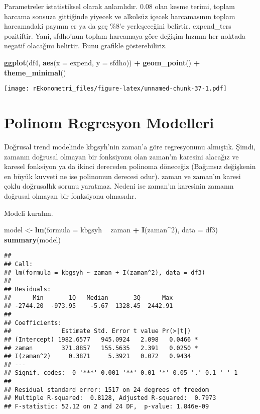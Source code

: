 \documentclass[
]{book}
\newenvironment{Shaded}{\begin{snugshade}}{\end{snugshade}}
\newcommand{\DataTypeTok}[1]{\textcolor[rgb]{0.13,0.29,0.53}{#1}}
\newcommand{\DecValTok}[1]{\textcolor[rgb]{0.00,0.00,0.81}{#1}}
\newcommand{\KeywordTok}[1]{\textcolor[rgb]{0.13,0.29,0.53}{\textbf{#1}}}
\newcommand{\NormalTok}[1]{#1}
\newcommand{\OperatorTok}[1]{\textcolor[rgb]{0.81,0.36,0.00}{\textbf{#1}}}
\newcommand{\StringTok}[1]{\textcolor[rgb]{0.31,0.60,0.02}{#1}}
\begin{document}
Parametreler istatistiksel olarak anlamlıdır. 0.08 olan kesme terimi, toplam harcama sonsuza gittiğinde yiyecek ve alkolsüz içecek harcamasının toplam harcamadaki payının er ya da geç \%8'e yerleşeceğini belirtir. expend\_ters pozitiftir. Yani, sfdho'nun toplam harcamaya göre değişim hızının her noktada negatif olacağını belirtir. Bunu grafikle gösterebiliriz.

\begin{Shaded}
\begin{Highlighting}[]
\KeywordTok{ggplot}\NormalTok{(df4, }\KeywordTok{aes}\NormalTok{(}\DataTypeTok{x =}\NormalTok{ expend, }\DataTypeTok{y =}\NormalTok{ sfdho)) }\OperatorTok{+}
\StringTok{  }\KeywordTok{geom_point}\NormalTok{() }\OperatorTok{+}
\StringTok{  }\KeywordTok{theme_minimal}\NormalTok{()}
\end{Highlighting}
\end{Shaded}

\texttt{[image: rEkonometri\_files/figure-latex/unnamed-chunk-37-1.pdf]}

\hypertarget{polinom-regresyon-modelleri}{%
\section{Polinom Regresyon Modelleri}\label{polinom-regresyon-modelleri}}

Doğrusal trend modelinde kbgsyh'nin zaman'a göre regresyonunu almıştık. Şimdi, zamanın doğrusal olmayan bir fonksiyonu olan zaman'ın karesini alacağız ve karesel fonksiyon ya da ikinci dereceden polinoma döneceğiz (Bağımsız değişkenin en büyük kuvveti ne ise polinomun derecesi odur). zaman ve zaman'ın karesi çoklu doğrusallık sorunu yaratmaz. Nedeni ise zaman'ın karesinin zamanın doğrusal olmayan bir fonksiyonu olmasıdır.

Modeli kuralım.

\begin{Shaded}
\begin{Highlighting}[]
\NormalTok{model <-}\StringTok{ }\KeywordTok{lm}\NormalTok{(}\DataTypeTok{formula =}\NormalTok{ kbgsyh }\OperatorTok{~}\StringTok{ }\NormalTok{zaman }\OperatorTok{+}\StringTok{ }\KeywordTok{I}\NormalTok{(zaman}\OperatorTok{^}\DecValTok{2}\NormalTok{), }\DataTypeTok{data =}\NormalTok{ df3)}
\KeywordTok{summary}\NormalTok{(model)}
\end{Highlighting}
\end{Shaded}

\begin{verbatim}
## 
## Call:
## lm(formula = kbgsyh ~ zaman + I(zaman^2), data = df3)
## 
## Residuals:
##      Min       1Q   Median       3Q      Max 
## -2744.20  -973.95    -5.67  1328.45  2442.91 
## 
## Coefficients:
##              Estimate Std. Error t value Pr(>|t|)  
## (Intercept) 1982.6577   945.0924   2.098   0.0466 *
## zaman        371.8857   155.5635   2.391   0.0250 *
## I(zaman^2)     0.3871     5.3921   0.072   0.9434  
## ---
## Signif. codes:  0 '***' 0.001 '**' 0.01 '*' 0.05 '.' 0.1 ' ' 1
## 
## Residual standard error: 1517 on 24 degrees of freedom
## Multiple R-squared:  0.8128, Adjusted R-squared:  0.7973 
## F-statistic: 52.12 on 2 and 24 DF,  p-value: 1.846e-09
\end{verbatim}
\end{document}
